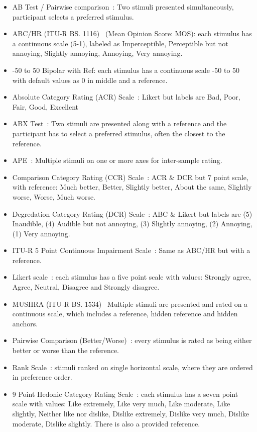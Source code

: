 \documentclass[11pt, oneside]{article}   	%
\begin{document}
		\begin{itemize}
			\item AB Test / Pairwise comparison~\cite{lipshitz1981great,david1963method}: Two stimuli presented simultaneously, participant selects a preferred stimulus.
			\item ABC/HR (ITU-R BS. 1116)~\cite{recommendation19971116} (Mean Opinion Score: MOS): each stimulus has a continuous scale (5-1), labeled as Imperceptible, Perceptible but not annoying, Slightly annoying, Annoying, Very annoying.
			\item -50 to 50 Bipolar with Ref: each stimulus has a continuous scale -50 to 50 with default values as 0 in middle and a reference.
			\item Absolute Category Rating (ACR) Scale~\cite{rec1996p}: Likert but labels are Bad, Poor, Fair, Good, Excellent 
			\item ABX Test~\cite{clark1982high}: Two stimuli are presented along with a reference and the participant has to select a preferred stimulus, often the closest to the reference.
			\item APE~\cite{ape}: Multiple stimuli on one or more axes for inter-sample rating.
			\item Comparison Category Rating (CCR) Scale~\cite{rec1996p}: ACR \& DCR but 7 point scale, with reference: Much better, Better, Slightly better, About the same, Slightly worse, Worse, Much worse.
			\item Degredation Category Rating (DCR) Scale~\cite{rec1996p}: ABC \& Likert but labels are (5) Inaudible, (4) Audible but not annoying, (3) Slightly annoying, (2) Annoying, (1) Very annoying.
			\item ITU-R 5 Point Continuous Impairment Scale~\cite{rec1997bs}: Same as ABC/HR but with a reference.
			\item Likert scale~\cite{likert1932technique}: each stimulus has a five point scale with values: Strongly agree, Agree, Neutral, Disagree and Strongly disagree.
			\item MUSHRA (ITU-R BS. 1534)~\cite{recommendation20031534}  Multiple stimuli are presented and rated on a continuous scale, which includes a reference, hidden reference and hidden anchors.
			\item Pairwise Comparison (Better/Worse)~\cite{david1963method}: every stimulus is rated as being either better or worse than the reference.
			\item Rank Scale~\cite{pascoe1983evaluation}: stimuli ranked on single horizontal scale, where they are ordered in preference order.
			\item 9 Point Hedonic Category Rating Scale~\cite{peryam1952advanced}: each stimulus has a seven point scale with values: Like extremely, Like very much, Like moderate, Like slightly, Neither like nor dislike, Dislike extremely, Dislike very much, Dislike moderate, Dislike slightly. There is also a provided reference.
		\end{itemize}
\end{document}
